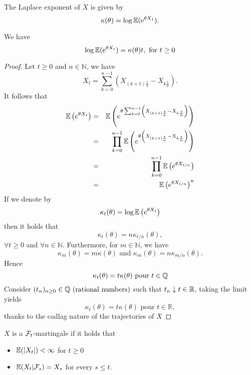 \begin{definition}
The Laplace exponent of $X$ is given by
$$
\kappa(\theta) = \log \mathbb{E}(\mathrm{e}^{\theta X_1}).
$$
\end{definition}
\begin{prop}
We have
$$
\log \mathbb{E}(\mathrm{e}^{\theta X_t}) = \kappa(\theta)t,\text{ for }t\geq 0
$$
\end{prop}
\begin{proof}
Let $t\geq 0$ and $n\in \mathbb{N}$, we have
$$
X_t=\sum_{k=0}^{n-1}\left(X_{(k+1)\frac{t}{n}} - X_{k\frac{t}{n}} \right).
$$
It follows that
\begin{eqnarray*}
\mathbb{E}\left(e^{\theta X_t}\right)&=&\mathbb{E}\left(e^{\theta \sum_{k=0}^{n-1}\left(X_{(k+1)\frac{t}{n}} - X_{k\frac{t}{n}} \right)}\right)\\
&=&\prod_{k=0}^{n-1}\mathbb{E}\left(e^{\theta \left(X_{(k+1)\frac{t}{n}} - X_{k\frac{t}{n}} \right)}\right)\\
&=&\prod_{k=0}^{n-1}\mathbb{E}\left(e^{\theta X_{t/n}}\right)\\
&=&\mathbb{E}\left(e^{\theta X_{t/n}}\right)^n\\
\end{eqnarray*}
If we denote by
$$
\kappa_t(\theta) = \log \mathbb{E}\left(e^{\theta X_t}\right)
$$
then it holds that 
$$
\kappa_t(\theta) = n\kappa_{t/n}(\theta),
$$
$\forall t\geq 0$ and $\forall n\in \mathbb{N}$. Furthermore, for $m\in\mathbb{N}$, we have
$$
\kappa_m(\theta) = m\kappa(\theta)\text{ and }\kappa_m(\theta) = n\kappa_{m/n}(\theta).
$$
Hence
$$
\kappa_t(\theta) = t\kappa(\theta)\text{ pour }t\in\mathbb{Q}
$$
Consider $(t_n)_{n\geq 0}\in \mathbb{Q}\text{ (rational numbers)}$ such that $t_n\downarrow t\in \mathbb{R}$, taking the limit yields
$$
\kappa_{t}(\theta) = t\kappa(\theta)\text{ pour }t\in\mathbb{R},
$$
thanks to the cadlag nature of the trajectories of $X$
\end{proof}
\begin{definition}\label{def:martingale_contd}
$X$ is a $\mathcal{F}_t$-martingale if it holds that
\begin{itemize}
    \item $\mathbb{E}(|X_t|)<\infty$ for $t\geq 0$
    \item $\mathbb{E}(X_t|\mathcal{F}_s) = X_s$ for every $s\leq t$.
\end{itemize}
\end{definition}


